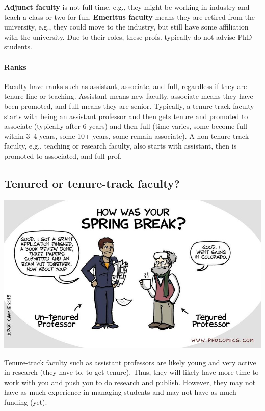\documentclass[oneside,11pt,dvipsnames]{book}
\begin{document}
\textbf{Adjunct faculty} is not full-time, e.g., they might be working in industry and teach a class or two for fun. \textbf{Emeritus faculty} means they are retired from the university, e.g., they could move to the industry, but still have some affiliation with the university.   Due to their roles, these profs. typically do not advise PhD students.


\paragraph{Ranks} Faculty have ranks such as assistant, associate, and full, regardless if they are tenure-line or teaching.  Assistant means new faculty, associate means they have been promoted, and full means they are senior. Typically, a tenure-track faculty starts with being an assistant professor and then gets tenure and promoted to associate (typically after 6 years) and then full (time varies, some become full within 3--4 years, some 10+ years, some remain associate). A non-tenure track faculty, e.g., teaching or research faculty, also starts with assistant, then is promoted to associated, and full prof.




\subsection{Tenured or tenure-track faculty?}\label{sec:tenure-vs-tenure-track}

\begin{center}
  \includegraphics[scale=0.4]{files/c8.png}
\end{center}


Tenure-track faculty such as assistant professors are likely young and very active in research (they have to, to get tenure). Thus, they will likely have more time to work with you and push you to do research and publish. However, they may not have as much experience in managing students and may not have as much funding (yet).
\end{document}
